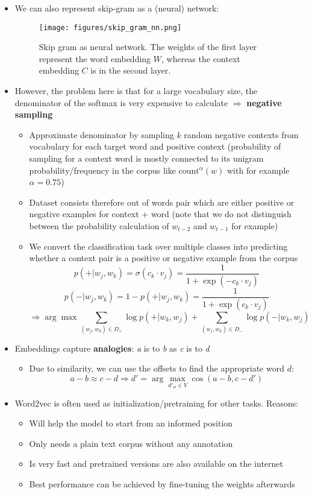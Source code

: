 \begin{itemize}
	\item We can also represent skip-gram as a (neural) network:
	\begin{figure}[ht]
		\centering
		\texttt{[image: figures/skip\_gram\_nn.png]}
		\caption{Skip gram as neural network. The weights of the first layer represent the word embedding $W$, whereas the context embedding $C$ is in the second layer.}
		\label{fig:skip_gram_nn}
	\end{figure}
	\item However, the problem here is that for a large vocabulary size, the denominator of the softmax is very expensive to calculate $\Rightarrow$ \textbf{negative sampling}
	\begin{itemize}
		\item Approximate denominator by sampling $k$ random negative contexts from vocabulary for each target word and positive context (probability of sampling for a context word is mostly connected to its unigram probability/frequency in the corpus like $\text{count}^{\alpha}(w)$ with for example $\alpha=0.75$)
		\item Dataset consists therefore out of words pair which are either positive or negative examples for context + word (note that we do not distinguish between the probability calculation of $w_{t-2}$ and $w_{t-1}$ for example)
		\item We convert the classification task over multiple classes into predicting whether a context pair is a positive or negative example from the corpus
		$$p\left(+|w_j, w_k\right) = \sigma(c_k\cdot v_j) = \frac{1}{1 + \exp(-c_k\cdot v_j)}$$
		$$p\left(-|w_j, w_k\right) = 1 - p\left(+|w_j, w_k\right) = \frac{1}{1 + \exp(c_k\cdot v_j)}$$
		$$\Rightarrow \arg\max \sum\limits_{\left(w_j, w_k\right)\in D_{+}} \log p\left(+|w_k,w_j\right) + \sum\limits_{\left(w_j, w_k\right)\in D_{-}} \log p\left(-|w_k,w_j\right) $$
	\end{itemize}
	\item Embeddings capture \textbf{analogies}: \textit{a} is to \textit{b} as \textit{c} is to \textit{d}
	\begin{itemize}
		\item Due to similarity, we can use the offsets to find the appropriate word $d$:
		$$a-b\approx c-d \Rightarrow d' = \arg\max_{d'_w \in V} \cos\left(a-b, c-d'\right)$$
	\end{itemize}
	\item Word2vec is often used as initialization/pretraining for other tasks. Reasons:
	\begin{itemize}
		\item Will help the model to start from an informed position
		\item Only needs a plain text corpus without any annotation
		\item Is very fast and pretrained versions are also available on the internet
		\item Best performance can be achieved by fine-tuning the weights afterwards
	\end{itemize}
\end{itemize}